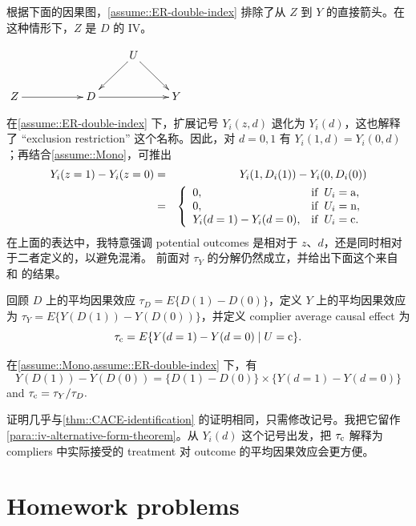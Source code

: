 根据下面的因果图，\cref{assume::ER-double-index} 排除了从 $Z$ 到 $Y$ 的直接箭头。在这种情形下，$Z$ 是 $D$ 的 IV。
\begin{center}
$
\xymatrix{
 && & U  \ar[dl] \ar[dr] &\\
Z \ar[rr] &&D \ar[rr]&&Y
}
$
\end{center}
在\cref{assume::ER-double-index} 下，扩展记号 $Y_i(z,d)$ 退化为 $Y_i(d)$，这也解释了 ``exclusion restriction'' 这个名称。因此，对 $d=0,1$ 有 $Y_i(1,d) = Y_i(0,d)$；再结合\cref{assume::Mono}，可推出
\begin{eqnarray*}
Y_i(z=1) - Y_i(z=0) &=& Y_i(1, D_i(1)) - Y_i(0, D_i(0)) \\
&=& \left \{ \begin{array} {ll}
0 , & \text{if} \hspace{2mm}  U_i = \textup{a}, \\
0 , & \text{if}  \hspace{2mm}  U_i = \textup{n},\\
Y_i(d=1) - Y_i(d=0) ,& \text{if} \hspace{2mm} U_i = \textup{c}.
\end{array}
\right.  
\end{eqnarray*}
在上面的表达中，我特意强调 potential outcomes 是相对于 $z$、$d$，还是同时相对于二者定义的，以避免混淆。
前面对 $\tau_Y$ 的分解仍然成立，并给出下面这个来自 \citet{imbens1994identification} 和 \citet{angrist1996identification} 的结果。

回顾 $D$ 上的平均因果效应 $\tau_D = E\{D(1)  - D(0) \}$，定义 $Y$ 上的平均因果效应为 $\tau_Y = E\{ Y(D(1)) - Y(D(0))  \}$，并定义 complier average causal effect 为
$$
\tau_{\textup{c}} =  E\{  Y(d=1) - Y(d=0) \mid U = \textup{c} \}.
$$

\begin{theorem}\label{thm::iv-double-index}
在\cref{assume::Mono,assume::ER-double-index} 下，有
$$
Y(D(1)) - Y(D(0)) = \{  D(1)  - D(0) \} \times \{ Y(d=1) - Y(d=0) \}
$$
and  
$
\tau_{\textup{c}}   =   \tau_Y /  \tau_D  .
$
\end{theorem}

证明几乎与\cref{thm::CACE-identification} 的证明相同，只需修改记号。我把它留作\cref{para::iv-alternative-form-theorem}。从 $Y_i(d)$ 这个记号出发，把 $\tau_{\textup{c}}$ 解释为 compliers 中实际接受的 treatment 对 outcome 的平均因果效应会更方便。



 




 
\section{Homework problems}



